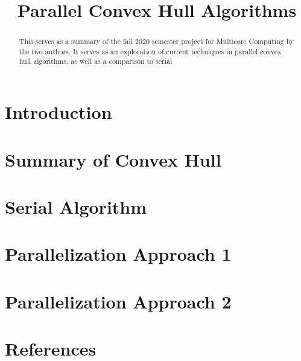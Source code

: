 \documentclass[conference]{IEEEtran}
\begin{document}
\title{Parallel Convex Hull Algorithms\\}

\author{
\and
{}
}

\maketitle

\begin{abstract}
This serves as a summary of the fall 2020 semester project for Multicore Computing by the two authors. It serves as an exploration of current techniques in parallel convex hull algorithms, as well as a comparison to serial 
\end{abstract}

\section{Introduction}

\section{Summary of Convex Hull}

\section{Serial Algorithm}

\section{Parallelization Approach 1}

\section{Parallelization Approach 2}

\section{References}
\end{document}
